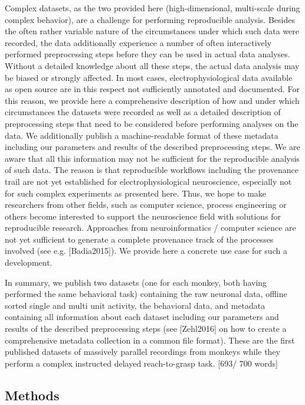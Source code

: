 {Complex datasets, as the two provided here (high-dimensional, multi-scale during complex behavior), are a challenge for performing reproducible analysis. Besides the often rather variable nature of the circumstances under which such data were recorded, the data additionally experience a number of often interactively performed preprocessing steps before they can be used in actual data analyses. Without a detailed knowledge about all these steps, the actual data analysis may be biased or strongly affected. In most cases, electrophysiological data available as open source are in this respect not sufficiently annotated and documented. For this reason, we provide here a comprehensive description of how and under which circumstances the datasets were recorded as well as a detailed description of preprocessing steps that need to be considered before performing analyses on the data. We additionally publish a machine-readable format of these metadata including our parameters and results of the described preprocessing steps. We are aware that all this information may not be sufficient for the reproducible analysis of such data. The reason is that reproducible workflows including the provenance trail are not yet established for electrophysiological neuroscience, especially not for such complex experiments as presented here. Thus, we hope to make researchers from other fields, such as computer science, process engineering or others become interested to support the neuroscience field with solutions for reproducible research. Approaches from neuroinformatics / computer science are not yet sufficient to generate a complete provenance track of the processes involved (see e.g. [Badia2015]). We provide here a concrete use case for such a development. 

In summary, we publish two datasets (one for each monkey, both having performed the same behavioral task) containing the raw neuronal data, offline sorted single and multi unit activity, the behavioral data, and metadata containing all information about each dataset including our parameters and results of the described preprocessing steps (see [Zehl2016] on how to create a comprehensive metadata collection in a common file format). These are the first published datasets of massively parallel recordings from monkeys while they perform a complex instructed delayed reach-to-grasp task. [693/ 700 words]

\subsection{Methods} 

}
